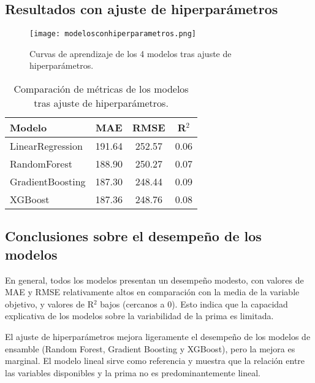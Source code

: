 \documentclass[12pt,a4paper]{article}
\begin{document}
\begin{itemize}
\subsection*{Resultados con ajuste de hiperparámetros}
\begin{figure}[H]
    \centering
    \texttt{[image: modelosconhiperparametros.png]}
    \caption{Curvas de aprendizaje de los 4 modelos tras ajuste de hiperparámetros.}
\end{figure}

\begin{table}[H]
\centering
\begin{tabular}{lccc}
\toprule
\textbf{Modelo} & \textbf{MAE} & \textbf{RMSE} & \textbf{R$^2$} \\
\midrule
LinearRegression & 191.64 & 252.57 & 0.06 \\
RandomForest & 188.90 & 250.27 & 0.07 \\
GradientBoosting & 187.30 & 248.44 & 0.09 \\
XGBoost & 187.36 & 248.76 & 0.08 \\
\bottomrule
\end{tabular}
\caption{Comparación de métricas de los modelos tras ajuste de hiperparámetros.}
\end{table}

\subsection*{Conclusiones sobre el desempeño de los modelos}

En general, todos los modelos presentan un desempeño modesto, con valores de MAE y RMSE relativamente altos en comparación con la media de la variable objetivo, y valores de R$^2$ bajos (cercanos a 0). Esto indica que la capacidad explicativa de los modelos sobre la variabilidad de la prima es limitada.

El ajuste de hiperparámetros mejora ligeramente el desempeño de los modelos de ensamble (Random Forest, Gradient Boosting y XGBoost), pero la mejora es marginal. El modelo lineal sirve como referencia y muestra que la relación entre las variables disponibles y la prima no es predominantemente lineal.


\end{itemize}
\end{document}
